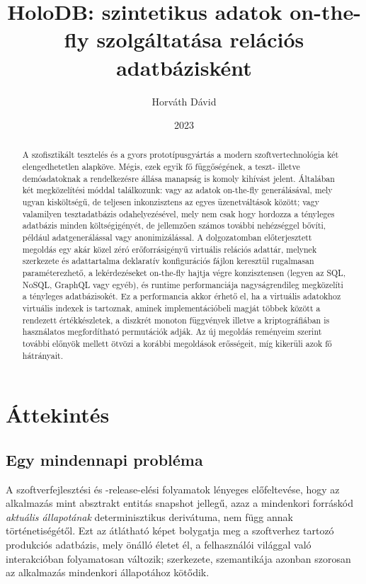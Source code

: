 \documentclass[
    parspace,
    noindent,
    nohyp,
]{elteiktdk}[2023/04/10]
\title{HoloDB: szintetikus adatok on-the-fly szolgáltatása relációs adatbázisként}
\date{2023}
\author{Horváth Dávid}
\affiliation{PhD, Mesteroktató}
\begin{document}

\makecover
\cleardoublepage

\maketitle

\tableofcontents
\cleardoublepage


\begin{abstract}
A szofisztikált tesztelés és a gyors prototípusgyártás
a modern szoftvertechnológia két elengedhetetlen alapköve.
Mégis, ezek egyik fő függőségének, a teszt- illetve demóadatoknak
a rendelkezésre állása manapság is komoly kihívást jelent.
Általában két megközelítési móddal találkozunk:
vagy az adatok on-the-fly generálásával, mely ugyan kisköltségű,
de teljesen inkonzisztens az egyes üzenetváltások között;
vagy valamilyen tesztadatbázis odahelyezésével,
mely nem csak hogy hordozza a tényleges adatbázis minden költségigényét,
de jellemzően számos további nehézséggel bővíti, például adatgenerálással vagy anonimizálással.
A dolgozatomban előterjesztett megoldás egy akár közel zéró erőforrásigényű virtuális relációs adattár,
melynek szerkezete és adattartalma deklaratív
konfigurációs fájlon keresztül rugalmasan paraméterezhető,
a lekérdezéseket on-the-fly hajtja végre konzisztensen
(legyen az SQL, NoSQL, GraphQL vagy egyéb),
és runtime performanciája nagyságrendileg megközelíti a tényleges adatbázisokét.
Ez a performancia akkor érhető el, ha a virtuális adatokhoz virtuális indexek is tartoznak,
aminek implementációbeli magját többek között a rendezett értékkészletek,
a diszkrét monoton függvények
illetve a kriptográfiában is használatos megfordítható permutációk adják.
Az új megoldás reményeim szerint további előnyök mellett ötvözi a korábbi megoldások erősségeit,
míg kikerüli azok fő hátrányait.
\end{abstract}

\chapter{Áttekintés}

\section{Egy mindennapi probléma}

A szoftverfejlesztési és -release-elési folyamatok lényeges előfeltevése,
hogy az alkalmazás mint absztrakt entitás snapshot jellegű,
azaz a mindenkori forráskód \textit{aktuális állapotának} determinisztikus derivátuma,
nem függ annak történetiségétől.
Ezt az átlátható képet bolygatja meg a szoftverhez tartozó produkciós adatbázis,
mely önálló életet él, a felhasználói világgal való interakcióban folyamatosan változik;
szerkezete, szemantikája azonban szorosan az alkalmazás mindenkori állapotához kötődik.
\end{document}
